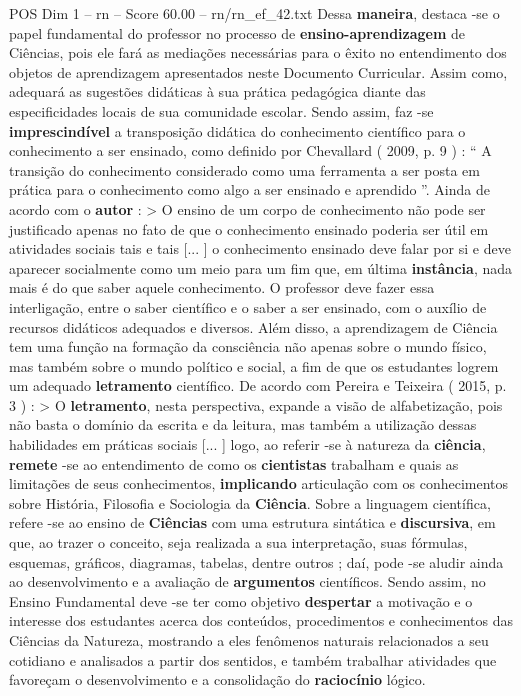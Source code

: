 \begin{textsample}{POS Dim 1 – rn – Score 60.00 – rn/rn\_ef\_42.txt}
Dessa \textbf{maneira}, destaca -se o papel fundamental do professor no processo de \textbf{ensino-aprendizagem} de Ciências, pois ele fará as mediações necessárias para o êxito no entendimento dos objetos de aprendizagem apresentados neste Documento Curricular.
Assim como, adequará as sugestões didáticas à sua prática pedagógica diante das especificidades locais de sua comunidade escolar.
Sendo assim, faz -se \textbf{imprescindível} a transposição didática do conhecimento científico para o conhecimento a ser ensinado, como definido por Chevallard ( 2009, p. 9 ) : “ A transição do conhecimento considerado como uma ferramenta a ser posta em prática para o conhecimento como algo a ser ensinado e aprendido ”.
Ainda de acordo com o \textbf{autor} : > O ensino de um corpo de conhecimento não pode ser justificado apenas no fato de que o conhecimento ensinado poderia ser útil em atividades sociais tais e tais [... ] o conhecimento ensinado deve falar por si e deve aparecer socialmente como um meio para um fim que, em última \textbf{instância}, nada mais é do que saber aquele conhecimento.
O professor deve fazer essa interligação, entre o saber científico e o saber a ser ensinado, com o auxílio de recursos didáticos adequados e diversos.
Além disso, a aprendizagem de Ciência tem uma função na formação da consciência não apenas sobre o mundo físico, mas também sobre o mundo político e social, a fim de que os estudantes logrem um adequado \textbf{letramento} científico.
De acordo com Pereira e Teixeira ( 2015, p. 3 ) : > O \textbf{letramento}, nesta perspectiva, expande a visão de alfabetização, pois não basta o domínio da escrita e da leitura, mas também a utilização dessas habilidades em práticas sociais [... ] logo, ao referir -se à natureza da \textbf{ciência}, \textbf{remete} -se ao entendimento de como os \textbf{cientistas} trabalham e quais as limitações de seus conhecimentos, \textbf{implicando} articulação com os conhecimentos sobre História, Filosofia e Sociologia da \textbf{Ciência}.
Sobre a linguagem científica, refere -se ao ensino de \textbf{Ciências} com uma estrutura sintática e \textbf{discursiva}, em que, ao trazer o conceito, seja realizada a sua interpretação, suas fórmulas, esquemas, gráficos, diagramas, tabelas, dentre outros ; daí, pode -se aludir ainda ao desenvolvimento e a avaliação de \textbf{argumentos} científicos.
Sendo assim, no Ensino Fundamental deve -se ter como objetivo \textbf{despertar} a motivação e o interesse dos estudantes acerca dos conteúdos, procedimentos e conhecimentos das Ciências da Natureza, mostrando a eles fenômenos naturais relacionados a seu cotidiano e analisados a partir dos sentidos, e também trabalhar atividades que favoreçam o desenvolvimento e a consolidação do \textbf{raciocínio} lógico.

\end{textsample}
